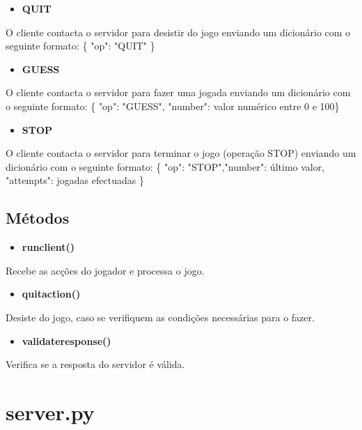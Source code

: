 \documentclass{report}
\begin{document}
\begin{itemize}
	\item \textbf{QUIT} 
\end{itemize}
O cliente contacta o servidor para desistir do jogo enviando um dicionário com o seguinte formato:
 \{ "op": "QUIT" \}


\begin{itemize}
	\item \textbf{GUESS}
\end{itemize}
O cliente contacta o servidor para fazer uma jogada enviando um dicionário com o seguinte formato:
 \{ "op": "GUESS", "number": valor numérico entre 0 e 100\}


\begin{itemize}
	\item \textbf{STOP}

\end{itemize}
O cliente contacta o servidor para terminar o jogo (operação STOP) enviando um
dicionário com o seguinte formato:
\{ "op": "STOP","number": último valor, "attempts": jogadas efectuadas \}


\subsection{Métodos}
\begin{itemize}
 \item \textbf{run\textunderscore client()}
\end{itemize}
Recebe as acções do jogador e processa o jogo.

\begin{itemize}
 \item \textbf{ quit\textunderscore action()}

\end{itemize}
Desiste do jogo, caso se verifiquem as condições necessárias para o fazer.

\begin{itemize}
 \item \textbf{ validate\textunderscore response()} 

\end{itemize}
Verifica se a resposta do servidor é válida.



\section{server.py}
\end{document}
